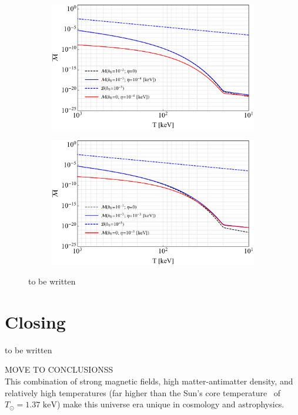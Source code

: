 \documentclass[a4paper]{article}
\newcommand*{\keV}{\text{ keV}}
\begin{document}
\begin{figure}[ht]
    \centering
    \begin{subfigure}[b]{0.49\textwidth}
        \includegraphics[width=\textwidth]{SpinLowFugacity.pdf}
    \end{subfigure}
    \hfill
    \begin{subfigure}[b]{0.49\textwidth}
        \includegraphics[width=\textwidth]{SpinMidFugacity.pdf}
    \end{subfigure}
    \caption{to be written}
    \label{fig:spin}
\end{figure}

\section{Closing}
\label{sec:conclusions}
\noindent to be written
 
MOVE TO CONCLUSIONSS\\
This combination of strong magnetic fields, high matter-antimatter density, and relatively high temperatures (far higher than the Sun's core temperature~\cite{bahcall2001solar} of $T_{\odot}=1.37\keV$) make this universe era unique in cosmology and astrophysics. 



\end{document}
